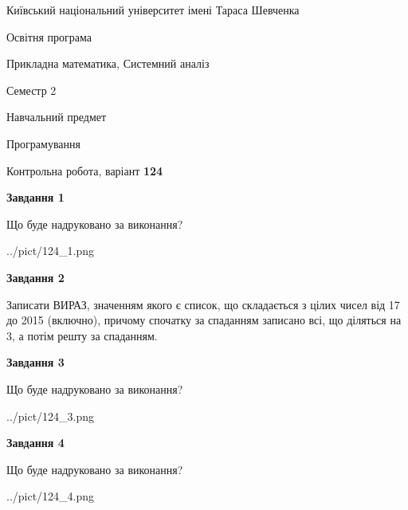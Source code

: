 \documentclass[12pt, ukrainian]{article}
\begin{document}
{{\begin {small}\par
{ \center  Київський національний університет імені Тараса Шевченка \par}
{\parbox {5 cm}{Освітня програма \hfill}{\parbox {8 cm}{Прикладна математика, Системний аналіз \hfill}}\parbox {5 cm}{\hfill Семестр 2}}\par
{\parbox {5 cm} {Навчальний предмет \hfill}\parbox {7 cm}{Програмування \hfill}\parbox {6cm}{\hfill}\par}\vspace{-7pt} \end{small}}{\center Контрольна робота, варіант  \No \textbf
{ 124 }\par}}
{
\begin {large}
{\begin {center}\textbf{Завдання 1}\end {center}}\par
Що буде надруковано за виконання?\par\par
\begin{center}
	{../pict/124_1.png}
\end{center}
\newpage

{\begin {center}\textbf{Завдання 2}\end {center}}\par

Записати ВИРАЗ, значенням якого є список, що складається з цілих чисел від 17 до 2015 (включно), причому спочатку за спаданням записано всі, що діляться на 3, а потім решту за спаданням.\par
\newpage

{\begin {center}\textbf{Завдання 3}\end {center}}\par
Що буде надруковано за виконання?\par
\begin{center}
	{../pict/124_3.png}
\end{center}
\newpage

{\begin {center}\textbf{Завдання 4}\end {center}}\par
Що буде надруковано за виконання?\par
\begin{center}
	{../pict/124_4.png}
\end{center}
\newpage


\end{large}}
\end{document}
